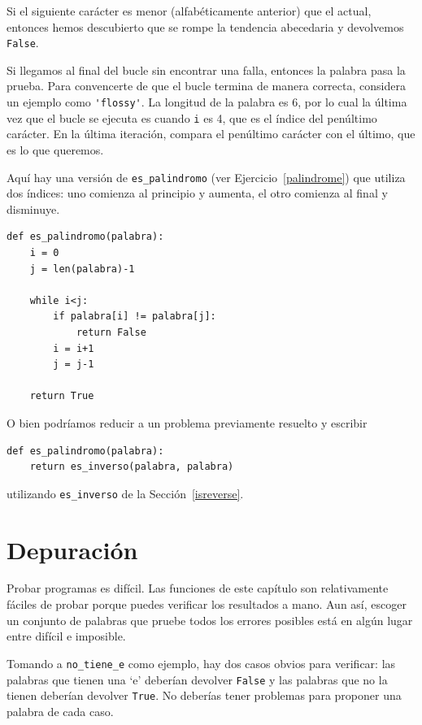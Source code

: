 \documentclass[10pt]{book}
\begin{document}
Si el siguiente carácter es menor (alfabéticamente anterior) que el
actual, entonces hemos descubierto que se rompe la tendencia abecedaria y
devolvemos {\tt False}.

Si llegamos al final del bucle sin encontrar una falla, entonces la
palabra pasa la prueba.  Para convencerte de que el bucle termina
de manera correcta, considera un ejemplo como \verb"'flossy'".  La
longitud de la palabra es 6, por lo cual
la última vez que el bucle se ejecuta es cuando {\tt i} es 4, que es el
índice del penúltimo carácter.  En la última iteración,
compara el penúltimo carácter con el último, que es
lo que queremos.

Aquí hay una versión de \verb"es_palindromo" (ver
Ejercicio~\ref{palindrome}) que utiliza dos índices: uno comienza al
principio y aumenta, el otro comienza al final y disminuye.

\begin{verbatim}
def es_palindromo(palabra):
    i = 0
    j = len(palabra)-1

    while i<j:
        if palabra[i] != palabra[j]:
            return False
        i = i+1
        j = j-1

    return True
\end{verbatim}

O bien podríamos reducir a un problema previamente
resuelto y escribir

\begin{verbatim}
def es_palindromo(palabra):
    return es_inverso(palabra, palabra)
\end{verbatim}
%
utilizando \verb"es_inverso" de la Sección~\ref{isreverse}.


\section{Depuración}

Probar programas es difícil.  Las funciones de este capítulo son
relativamente fáciles de probar porque puedes verificar los resultados a mano.
Aun así, escoger un conjunto de palabras que pruebe todos los errores posibles
está en algún lugar entre difícil e imposible.

Tomando a \verb"no_tiene_e" como ejemplo, hay dos casos obvios
para verificar: las palabras que tienen una `e' deberían devolver {\tt False} y
las palabras que no la tienen deberían devolver {\tt True}.  No deberías
tener problemas para proponer una palabra de cada caso.
\end{document}
